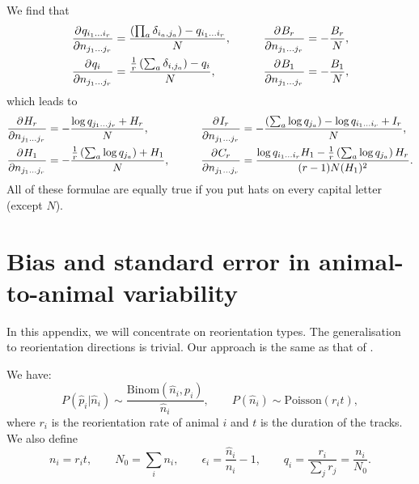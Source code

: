 \documentclass[12pt]{article}
\begin{document}
We find that
%
\begin{equation}\label{eq:dqbydn}
  \begin{aligned}
    \pdiff{q_{i_1\ldots i_r}}{n_{j_1\ldots j_r}} &= \frac{\prn{\prod_a \delta_{i_a,j_a}} - q_{i_1\ldots i_r}}{N}, &
    \qquad
    \pdiff{B_{r}}{n_{j_1\ldots j_r}} &= -\frac{B_r}{N},\\
    \pdiff{q_{i}}{n_{j_1\ldots j_r}} &= \frac{\frac{1}{r} \prn{\sum_a \delta_{i,j_a}} - q_{i}}{N}, &
    \pdiff{B_{1}}{n_{j_1\ldots j_r}} &= -\frac{B_1}{N},
   \end{aligned}
\end{equation}
%
which leads to
%
\begin{equation}\label{eq:dhbydn}
  \begin{aligned}
    \pdiff{H_r}{n_{j_1\ldots j_r}} &= -\frac{\log q_{j_1\ldots j_r} + H_r}{N}, &
    \qquad
    \pdiff{I_{r}}{n_{j_1\ldots j_r}} &= -\frac{\prn{\sum_a \log q_{j_a}}-\log q_{i_1\ldots i_r} + I_r}{N}, \\
    \pdiff{H_1}{n_{j_1\ldots j_r}} &= -\frac{\frac{1}{r} \prn{\sum_a \log q_{j_a}} + H_1}{N}, &
    \pdiff{C_{r}}{n_{j_1\ldots j_r}} &= \frac{\log q_{i_1\ldots i_r} H_1 - \frac{1}{r} \prn{\sum_a \log q_{j_a}} H_r}{(r-1)N(H_1)^2}.
   \end{aligned}
\end{equation}
%
All of these formulae are equally true if you put hats on every capital letter (except $N$).


\section{Bias and standard error in animal-to-animal variability}\label{sec:varibias}

In this appendix, we will concentrate on reorientation types. The generalisation to reorientation directions is trivial. Our approach is the same as that of \cite{Roulston1999}.

We have:
%
\begin{equation}\label{eq:estdist}
  P(\hat{p}_i|\hat{n}_i) \sim \frac{\mathrm{Binom}(\hat{n}_i,p_i)}{\hat{n}_i},
  \qquad
  P(\hat{n}_i) \sim \mathrm{Poisson}(r_it),
\end{equation}
%
where $r_i$ is the reorientation rate of animal $i$ and $t$ is the duration of the tracks. We also define
%
\begin{equation}\label{eq:biasnot}
  n_i = r_it, \qquad
  N_0 = \sum_i n_i, \qquad
  \epsilon_i = \frac{\hat{n}_i}{n_i}-1, \qquad
  q_i = \frac{r_i}{\sum_j r_j} = \frac{n_i}{N_0}.
\end{equation}
%
\end{document}
